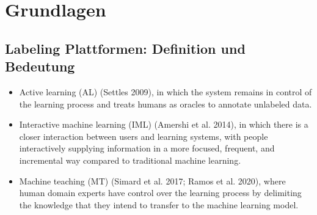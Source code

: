 \chapter{Grundlagen}\label{sec:labeling-plattformen-definition}
\section{Labeling Plattformen: Definition und Bedeutung}

\begin{itemize}
    \item Active learning (AL) (Settles 2009), in which the system remains in control of the
learning process and treats humans as oracles to annotate unlabeled data.
    \item Interactive machine learning (IML) (Amershi et al. 2014), in which there is a closer
interaction between users and learning systems, with people interactively supplying
information in a more focused, frequent, and incremental way compared to traditional
machine learning.
    \item Machine teaching (MT) (Simard et al. 2017; Ramos et al. 2020), where human domain
experts have control over the learning process by delimiting the knowledge that they
intend to transfer to the machine learning model.
\end{itemize}